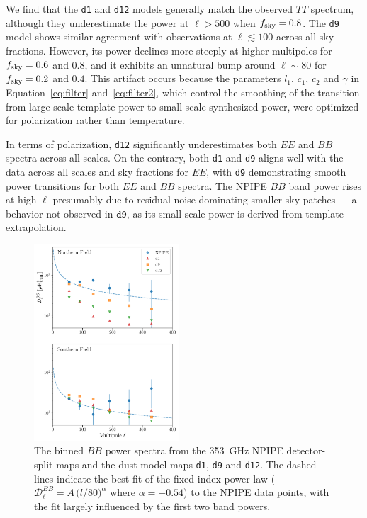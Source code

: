 \documentclass[twocolumn]{aastex631}
\begin{document}
We find that the \texttt{d1} and \texttt{d12} models generally match the observed $TT$ spectrum, although they underestimate the power at $\ell > 500$ when $f_{\rm sky} = 0.8$. The \texttt{d9} model shows similar agreement with observations at $\ell \lesssim 100$ across all sky fractions. However, its power declines more steeply at higher multipoles for $f_{\rm sky} = 0.6$ and $0.8$, and it exhibits an unnatural bump around $\ell \sim 80$ for $f_{\rm sky} = 0.2$ and $0.4$. This artifact occurs because the parameters $l_1$, $c_1$, $c_2$ and $\gamma$ in Equation~\ref{eq:filter} and~\ref{eq:filter2}, which control the smoothing of the transition from large-scale template power to small-scale synthesized power, were optimized for polarization rather than temperature. 

In terms of polarization, \texttt{d12} significantly underestimates both $EE$ and $BB$ spectra across all scales. On the contrary, both \texttt{d1} and \texttt{d9} aligns well with the data across all scales and sky fractions for $EE$, with \texttt{d9} demonstrating smooth power transitions for both $EE$ and $BB$ spectra. The NPIPE $BB$ band power rises at high-$\ell$ presumably due to residual noise dominating smaller sky patches --- a behavior not observed in $\texttt{d9}$, as its small-scale power is derived from template extrapolation. 

\begin{figure}
    \centering
    \includegraphics[width=0.48\textwidth]{figures/smallfield_power.pdf}
    \caption{The binned $BB$ power spectra from the 353~GHz NPIPE detector-split maps and the dust model maps \texttt{d1}, \texttt{d9} and \texttt{d12}. The dashed lines indicate the best-fit of the fixed-index power law ($\mathcal{D}_\ell^{BB} = A \, \big( l/80 \big)^{\alpha}$ where $\alpha = -0.54$) to the NPIPE data points, with the fit largely influenced by the first two band powers.}
    \label{fig:smallfield_power}
\end{figure}
\end{document}
